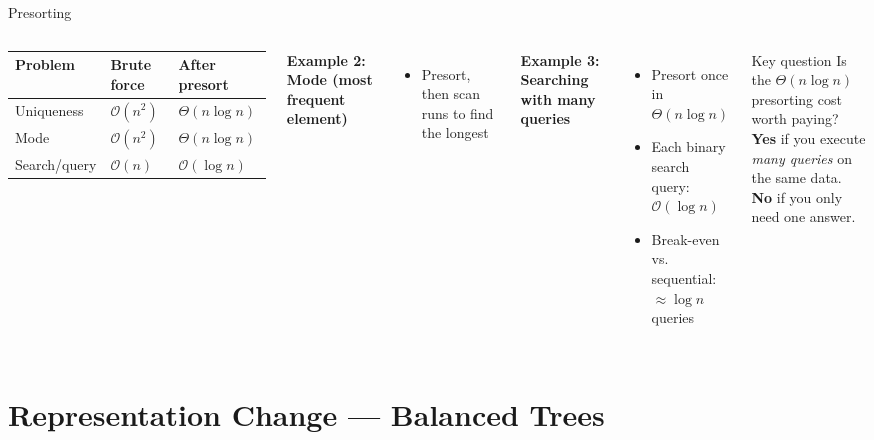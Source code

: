 \documentclass[aspectratio=169]{beamer}
\begin{document}
\begin{frame}[shrink=20]{Presorting}
\begin{columns}[T]
      \vspace{0.2em}
      \scriptsize
      \begin{tabular}{@{}lll@{}}
        \toprule
        \textbf{Problem} & \textbf{Brute force} & \textbf{After presort} \\
        \midrule
        Uniqueness & $\mathcal{O}(n^2)$ & $\Theta(n\log n)$ \\
        Mode       & $\mathcal{O}(n^2)$ & $\Theta(n\log n)$ \\
        Search/query & $\mathcal{O}(n)$ & $\mathcal{O}(\log n)$ \\
        \bottomrule
      \end{tabular}
      \textbf{Example 2: Mode (most frequent element)}
      \begin{itemize}
        \item Presort, then scan runs to find the longest
      \end{itemize}
      \vspace{0.3em}
      \textbf{Example 3: Searching with many queries}
      \begin{itemize}
        \item Presort once in $\Theta(n\log n)$
        \item Each binary search query: $\mathcal{O}(\log n)$
        \item Break-even vs. sequential: $\approx \log n$ queries
      \end{itemize}
      \vspace{0.4em}
      \begin{alertblock}{Key question}
        Is the $\Theta(n\log n)$ presorting cost worth paying?\\
        \textbf{Yes} if you execute \emph{many queries} on the same data.\\
        \textbf{No} if you only need one answer.
      \end{alertblock}
  \end{columns}
\end{frame}

\section{Representation Change — Balanced Trees}
\end{document}
